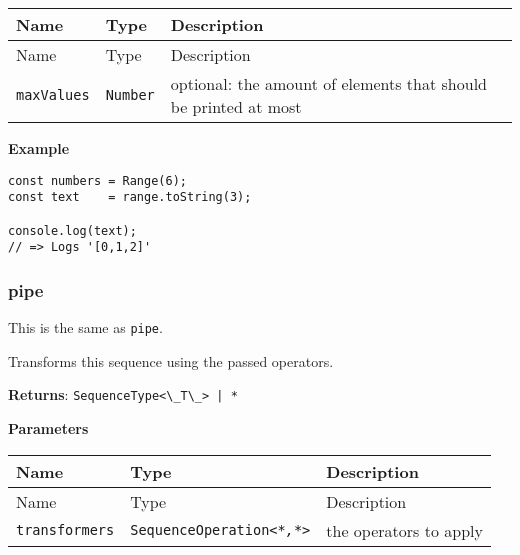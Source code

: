 \begin{longtable}[]{
  >{\raggedright\arraybackslash}p{}
  >{\raggedright\arraybackslash}p{}
  >{\raggedright\arraybackslash}p{}@{}}

\toprule\noalign{}
Name & Type & Description \\
\midrule\noalign{}
\endfirsthead
\toprule\noalign{}
Name & Type & Description \\
\midrule\noalign{}
\endhead
\bottomrule\noalign{}
\endlastfoot
\passthrough{\lstinline!maxValues!} & \passthrough{\lstinline!Number!} &
optional: the amount of elements that should be printed at most \\
\end{longtable}

\textbf{Example}

\begin{lstlisting}[label=3b9092ce-ad67-4baa-a872-a38a7455ebb4]
const numbers = Range(6);
const text    = range.toString(3);
                                   
console.log(text);
// => Logs '[0,1,2]'
\end{lstlisting}

\hypertarget{e862d602-1a86-4fc9-8159-7b7d136c9ed6}{%
\subsubsection{pipe}\label{e862d602-1a86-4fc9-8159-7b7d136c9ed6}}

This is the same as \passthrough{\lstinline!pipe!}.

Transforms this sequence using the passed operators.

\textbf{Returns}: \passthrough{\lstinline!SequenceType<\_T\_> | *!}

\textbf{Parameters}

\begin{longtable}[]{
  >{\raggedright\arraybackslash}p{}
  >{\raggedright\arraybackslash}p{}
  >{\raggedright\arraybackslash}p{}@{}}

\toprule\noalign{}
Name & Type & Description \\
\midrule\noalign{}
\endfirsthead
\toprule\noalign{}
Name & Type & Description \\
\midrule\noalign{}
\endhead
\bottomrule\noalign{}
\endlastfoot
\passthrough{\lstinline!transformers!} &
\passthrough{\lstinline!SequenceOperation<*!}\emph{\passthrough{\lstinline!,*!}}\passthrough{\lstinline!>!}
& the operators to apply \\
\end{longtable}

